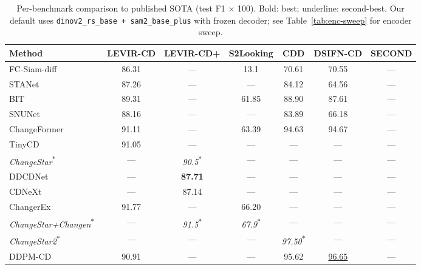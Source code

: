 \begin{table}[t]
  \centering
  \small
  \caption{Per-benchmark comparison to published SOTA (test F1 $\times$ 100).
    Bold: best; underline: second-best. Our default uses
    \texttt{dinov2\_rs\_base + sam2\_base\_plus} with frozen decoder; see
    Table~\ref{tab:enc-sweep} for encoder sweep.}
  \label{tab:sota}
  \begin{tabular}{lcccccc}
    \toprule
    Method & LEVIR-CD & LEVIR-CD+ & S2Looking & CDD & DSIFN-CD & SECOND \\
    \midrule
    FC-Siam-diff~\citep{daudt2018fully}            & 86.31 & ---  & 13.1  & 70.61 & 70.55 & ---   \\
    STANet~\citep{chen2020spatial}                 & 87.26 & ---  & ---   & 84.12 & 64.56 & ---   \\
    BIT~\citep{chen2021remote}                     & 89.31 & ---  & 61.85 & 88.90 & 87.61 & ---   \\
    SNUNet~\citep{fang2021snunet}                  & 88.16 & ---  & ---   & 83.89 & 66.18 & ---   \\
    ChangeFormer~\citep{bandara2022changeformer}   & 91.11 & ---  & 63.39 & 94.63 & 94.67 & ---   \\
    TinyCD~\citep{codegoni2023tinycd}              & 91.05 & ---  & ---   & ---   & ---   & ---   \\
    \emph{ChangeStar}\textsuperscript{$\ast$}~\citep{zheng2022changestar}         & ---   & \emph{90.5}\textsuperscript{$\ast$} & ---   & ---   & ---   & ---   \\
    DDCDNet~\citep{ddcdnet2024}                    & ---   & \textbf{87.71} & ---   & ---   & ---   & ---   \\
    CDNeXt~\citep{cdnext2023}                      & ---   & 87.14         & ---   & ---   & ---   & ---   \\
    ChangerEx~\citep{fang2023changer}              & 91.77 & ---  & 66.20 & ---   & ---   & ---   \\
    \emph{ChangeStar+Changen}\textsuperscript{$\ast$}~\citep{zheng2023changen} & ---   & \emph{91.5}\textsuperscript{$\ast$} & \emph{67.9}\textsuperscript{$\ast$} & ---   & ---   & ---   \\
    \emph{ChangeStar2}\textsuperscript{$\ast$}~\citep{zheng2024changestar2}    & ---   & ---  & ---   & \emph{97.50}\textsuperscript{$\ast$} & ---   & ---   \\
    DDPM-CD~\citep{bandara2024ddpmcd}              & 90.91 & ---  & ---   & 95.62 & \underline{96.65} & ---   \\

\end{tabular}
\end{table}
